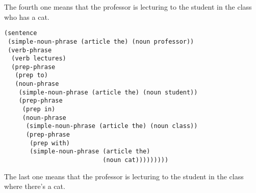 \documentclass[a4paper,12pt]{article}
\begin{document}
The fourth one means that the professor is lecturing to the student in
the class who has a cat.

\begin{lstlisting}
(sentence
 (simple-noun-phrase (article the) (noun professor))
 (verb-phrase
  (verb lectures)
  (prep-phrase
   (prep to)
   (noun-phrase
    (simple-noun-phrase (article the) (noun student))
    (prep-phrase
     (prep in)
     (noun-phrase
      (simple-noun-phrase (article the) (noun class))
      (prep-phrase
       (prep with)
       (simple-noun-phrase (article the)
                           (noun cat)))))))))
\end{lstlisting}

The last one means that the professor is lecturing to the student in
the class where there's a cat.
\end{document}
